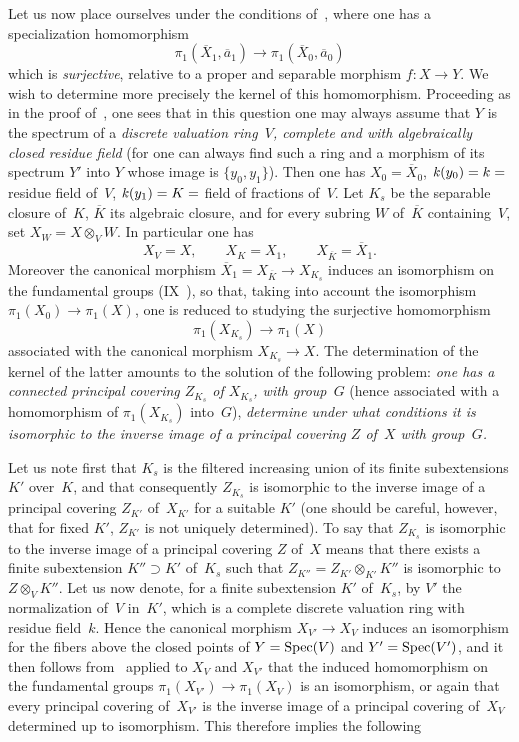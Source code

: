 Let us now place ourselves under the conditions of~,
where one has a specialization homomorphism
$$
\pi_1(\overline X_1,\overline a_1)\to\pi_1(\overline X_0,\overline
a_0)
$$
which is \emph{surjective}, relative to a proper and
separable morphism $f\colon X\to Y$. We wish to determine more precisely the kernel of
this homomorphism. Proceeding as in the proof
of~, one sees that in this question one may always
assume that $Y$ is the spectrum of a \emph{discrete valuation
ring~$V$, complete and with algebraically closed
residue field} (for one can always find such a ring
and a morphism of its spectrum $Y'$ into $Y$ whose image is
$\{y_0,y_1\}$). Then one has $X_0=\overline X_0$, $\mathit{k}(y_0)=k=$
residue field of~$V$, $\mathit{k}(y_1)=K=$ field of fractions of~$V$. Let
$K_s$ be the separable closure of~$K$, $\overline K$ its
algebraic closure, and for every subring $W$ of~$\overline
K$ containing~$V$, set $X_W=X\otimes_V W$. In particular one has
$$
X_V=X, \qquad X_K=X_1, \qquad X_{\overline K}=\overline X_1.
$$
Moreover the canonical morphism $\overline X_1=X_{\overline K}\to
X_{K_s}$ induces an isomorphism on the fundamental groups
(IX~), so that, taking into account
the isomorphism~ $\pi_1(X_0)\to\pi_1(X)$, one is reduced
to studying the surjective homomorphism
$$
\pi_1(X_{K_s})\to\pi_1(X)
$$
associated
with the canonical morphism $X_{K_s}\to X$. The determination of the kernel
of the latter amounts to the solution of the following problem:
\emph{one has a connected principal covering $Z_{K_s}$ of
$X_{K_s}$, with group~$G$} (hence associated with a homomorphism of
$\pi_1(X_{K_s})$ into~$G$), \emph{determine under what
conditions it is isomorphic to the inverse image of a
principal covering $Z$ of~$X$ with group~$G$.}

Let us note first that $K_s$ is the filtered increasing union of its
finite subextensions $K'$ over~$K$, and that consequently $Z_{K_s}$
is isomorphic to the inverse image of a principal covering
$Z_{K'}$ of~$X_{K'}$ for a suitable $K'$ (one should be careful,
however, that for fixed $K'$, $Z_{K'}$ is not uniquely
determined). To say that $Z_{K_s}$ is isomorphic to the inverse
image of a principal covering $Z$ of~$X$ means that there exists
a finite subextension $K''\supset K'$ of~$K_s$ such that
$Z_{K''}=Z_{K'}\otimes_{K'} K''$ is isomorphic to $Z\otimes_V
K''$. Let us now denote, for a finite subextension $K'$
of~$K_s$, by $V'$ the normalization of~$V$ in~$K'$, which is a
complete discrete valuation ring with
residue field~$k$. Hence the canonical morphism $X_{V'}\to X_V$ induces
an isomorphism for the fibers above the closed points of
$Y=\operatorname{Spec}(V)$ and $Y'=\operatorname{Spec}(V')$, and it then follows from~
applied to $X_V$ and $X_{V'}$ that the induced homomorphism on
the fundamental groups $\pi_1(X_{V'})\to \pi_1(X_V)$ is an
isomorphism, or again that every principal covering of~$X_{V'}$
is the inverse image of a principal covering of~$X_V$
determined up to isomorphism. This therefore implies the
following

